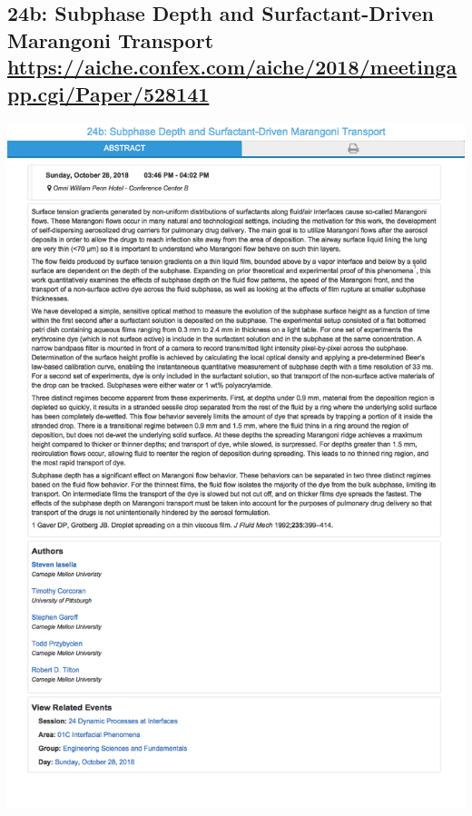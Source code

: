 \documentclass[11pt]{article}
\begin{document}
\subsection{24b: Subphase Depth and Surfactant-Driven Marangoni Transport \url{https://aiche.confex.com/aiche/2018/meetingapp.cgi/Paper/528141}}
\label{sec:orgd128bce}
\begin{center}
\includegraphics[width=.9\linewidth]{./528141.png}
\end{center}
\end{document}
